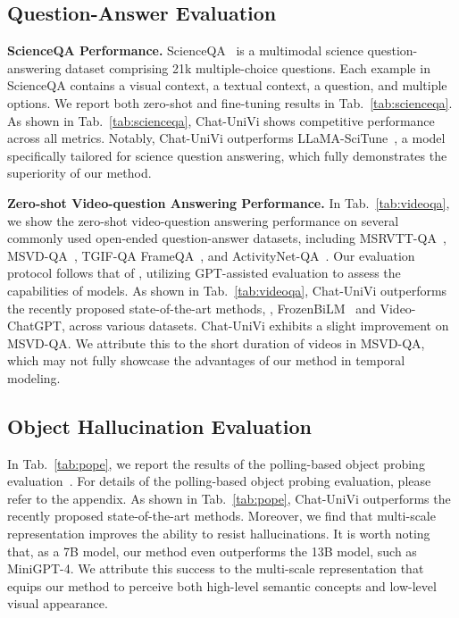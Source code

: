\documentclass[10pt,twocolumn,letterpaper]{article}
\newcommand{\myparagraph}[1]{\textbf{#1}\hspace{1.8ex}}
\begin{document}
\subsection{Question-Answer Evaluation}
\myparagraph{ScienceQA Performance.} ScienceQA~\cite{lu2022learn} is a multimodal science question-answering dataset comprising 21k multiple-choice questions. Each example in ScienceQA contains a visual context, a textual context, a question, and multiple options. We report both zero-shot and fine-tuning results in Tab.~\ref{tab:scienceqa}. As shown in Tab.~\ref{tab:scienceqa}, Chat-UniVi shows competitive performance across all metrics. Notably, Chat-UniVi outperforms LLaMA-SciTune~\cite{horawalavithana2023scitune}, a model specifically tailored for science question answering, which fully demonstrates the superiority of our method.

\noindent \myparagraph{Zero-shot Video-question Answering Performance.} 
In Tab.~\ref{tab:videoqa}, we show the zero-shot video-question answering performance on several commonly used open-ended question-answer datasets, including MSRVTT-QA~\cite{xu2017video}, MSVD-QA~\cite{xu2017video}, TGIF-QA FrameQA~\cite{jang2017tgif}, and ActivityNet-QA~\cite{yu2019activitynet}. Our evaluation protocol follows that of \citet{maaz2023video}, utilizing GPT-assisted evaluation to assess the capabilities of models. As shown in Tab.~\ref{tab:videoqa}, Chat-UniVi outperforms the recently proposed state-of-the-art methods, \eg, FrozenBiLM~\cite{yang2022zero} and Video-ChatGPT, across various datasets. Chat-UniVi exhibits a slight improvement on MSVD-QA. We attribute this to the short duration of videos in MSVD-QA, which may not fully showcase the advantages of our method in temporal modeling.

\subsection{Object Hallucination Evaluation}
In Tab.~\ref{tab:pope}, we report the results of the polling-based object probing evaluation~\cite{li2023evaluating}. For details of the polling-based object probing evaluation, please refer to the appendix. As shown in Tab.~\ref{tab:pope}, Chat-UniVi outperforms the recently proposed state-of-the-art methods. Moreover, we find that multi-scale representation improves the ability to resist hallucinations. It is worth noting that, as a 7B model, our method even outperforms the 13B model, such as MiniGPT-4. We attribute this success to the multi-scale representation that equips our method to perceive both high-level semantic concepts and low-level visual appearance. 
\end{document}
